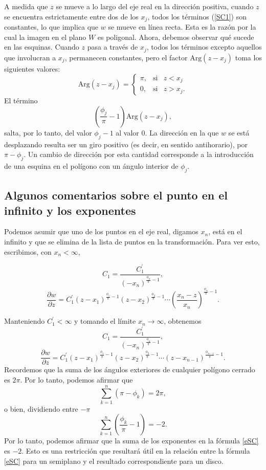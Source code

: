 A medida que $z$ se mueve a lo largo del eje real en la dirección positiva, cuando $z$ se encuentra estrictamente entre dos de los $x_j$,  todos los términos (\ref{SC1}) son constantes, lo que implica que $w$ se mueve en línea recta.
Esta es la razón por la cual la imagen en el plano $W$ es poligonal. Ahora, debemos observar qué sucede en las esquinas. Cuando $z$ pasa a través de $x_j$, todos los términos excepto aquellos que involucran a $x_j$, permanecen constantes, pero el factor $\mbox{Arg}(z-x_j)$ toma los siguientes valores:
\[
\mbox{Arg}(z-x_j)=\left\{\begin{array}{ccr}
	\pi, &\mbox{si}&z<x_j\\
	0,&\mbox{si}& z>x_j.
\end{array} \right.
\]
El término 
$$\left(\dfrac{\phi_j}{\pi}-1\right) \mbox{Arg}(z-x_j),$$
salta, por lo tanto, del valor $\phi_j-1$ al valor $0$. La dirección en la que $w$ se está desplazando resulta ser un giro positivo (es decir, en sentido antihorario), por $\pi -\phi_j$. Un cambio de dirección por esta cantidad corresponde a la introducción de una esquina en el polígono con un ángulo interior de $\phi_j$.\\

\subsection{Algunos comentarios sobre el punto en el infinito y los exponentes}
Podemos asumir que uno de los puntos en el eje real, digamos $x_n$, está en el infinito y que se elimina de la lista de puntos en la transformación. Para ver esto, escribimos, con $x_n <\infty$,

$$C_1=\dfrac{C_1^{'}}{(-x_n)^{\frac{\phi_n}{\pi}-1}},$$
$$\dfrac{\partial w}{\partial z}=C_1^{'}(z-x_1)^{\frac{\phi_1}{\pi}-1}(z-x_2)^{\frac{\phi_2}{\pi}-1}\cdots\left(\dfrac{x_n-z}{x_n}\right)^{\frac{\phi_n}{\pi}-1}.$$

Manteniendo  $C_1^{'}<\infty$ y tomando el límite $x_n\rightarrow \infty$, obtenemos 
$$C_1=\dfrac{C_1^{'}}{(-x_n)^{\frac{\phi_n}{\pi}-1}},$$
$$\dfrac{\partial w}{\partial z}=C_1^{'}(z-x_1)^{\frac{\phi_1}{\pi}-1}(z-x_2)^{\frac{\phi_2}{\pi}-1}\cdots(z-x_{n-1})^{\frac{\phi_{n-1}}{\pi}-1}.$$
Recordemos que la suma de los ángulos exteriores de cualquier polígono cerrado es $2\pi$. Por lo tanto, podemos afirmar que
$$\sum_{k=1}^{n}(\pi-\phi_k)=2\pi,$$
o bien, dividiendo entre $-\pi$
$$\sum_{k=1}^{n}\left(\dfrac{\phi_k}{\pi}-1\right)=-2.$$
Por lo tanto, podemos afirmar que la suma de los exponentes en la fórmula \ref{eSC} es $-2$. Esto es una restricción que resultará útil en la relación entre la fórmula \ref{eSC} para un semiplano y el resultado correspondiente para un disco.

